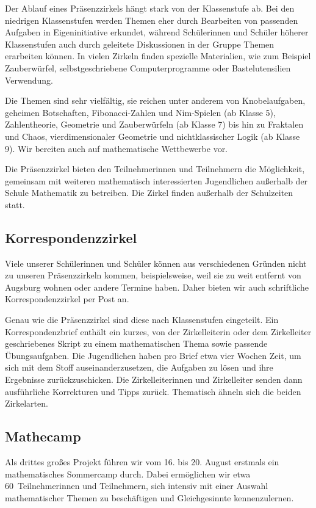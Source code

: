 \documentclass[12pt]{zettel}
\begin{document}
Der Ablauf eines Präsenzzirkels hängt stark von der Klassenstufe ab. Bei den
niedrigen Klassenstufen werden Themen eher durch Bearbeiten von passenden
Aufgaben in Eigeninitiative erkundet, während Schülerinnen und Schüler höherer
Klassenstufen auch durch geleitete Diskussionen in der Gruppe
Themen erarbeiten können. In vielen Zirkeln finden spezielle Materialien,
wie zum Beispiel Zauberwürfel, selbstgeschriebene Computerprogramme oder
Bastelutensilien Verwendung.

Die Themen sind sehr vielfältig, sie reichen unter anderem von
Knobelaufgaben, geheimen Botschaften, Fibonacci-Zahlen und Nim-Spielen (ab Klasse 5),
Zahlentheorie, Geometrie und Zauberwürfeln (ab Klasse 7) bis hin zu
Fraktalen und Chaos, vierdimensionaler Geometrie und nichtklassischer Logik
(ab Klasse 9). Wir bereiten auch auf mathematische Wettbewerbe vor. 

Die Präsenzzirkel bieten den Teilnehmerinnen und Teilnehmern die Möglichkeit,
gemeinsam mit weiteren mathematisch interessierten Jugendlichen außerhalb der
Schule Mathematik zu betreiben. Die Zirkel finden außerhalb der Schulzeiten
statt.


\subsection{Korrespondenzzirkel}

Viele unserer Schülerinnen und Schüler können aus verschiedenen Gründen
nicht zu unseren Präsenzzirkeln kommen, beispielsweise, weil sie zu weit
entfernt von Augsburg wohnen oder andere Termine haben.
Daher bieten wir auch schriftliche Korrespondenzzirkel per Post
an.

Genau wie die Präsenzzirkel sind diese nach Klassenstufen eingeteilt. Ein
Korrespondenzbrief enthält ein kurzes, von der Zirkelleiterin oder dem
Zirkelleiter geschriebenes Skript zu einem mathematischen Thema sowie passende
Übungsaufgaben. Die Jugendlichen haben pro Brief etwa vier Wochen Zeit, um sich
mit dem Stoff auseinanderzusetzen, die Aufgaben zu lösen und ihre Ergebnisse
zurückzuschicken. Die Zirkelleiterinnen und Zirkelleiter senden dann
ausführliche Korrekturen und Tipps zurück.
Thematisch ähneln sich die beiden Zirkelarten.


\subsection{Mathecamp}

Als drittes großes Projekt führen wir vom 16. bis 20. August erstmals ein
mathematisches Sommercamp durch. Dabei ermöglichen wir etwa 60~Teilnehmerinnen
und Teilnehmern, sich intensiv mit einer Auswahl mathematischer Themen zu
beschäftigen und Gleichgesinnte kennenzulernen.
\end{document}
